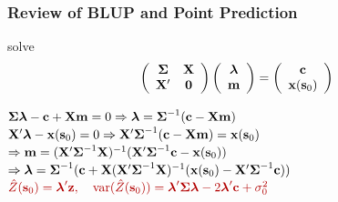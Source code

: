 \documentclass[mathserif,compress]{beamer}\usepackage{graphicx, color}
\def\bc{\mathbf{c}}
\def\bm{\mathbf{m}}
\def\bs{\mathbf{s}}
\def\bx{\mathbf{x}}
\def\bz{\mathbf{z}}
\def\bX{\mathbf{X}}
\def\blambda{\mbox{\boldmath $\lambda$}}
\def\bSigma{\mbox{\boldmath $\Sigma$}}
\def\var{\textrm{var}}
\def\bzero{\mathbf{0}}
\def\upp{^\prime}
\def\upi{^{-1}}
\newcommand{\cre}[1]{\color{red!70!black}#1}
\begin{document}
\begin{frame}[fragile]
\frametitle{Review of BLUP and Point Prediction}

	solve 
	\[
		\left(\begin{array}{cc}
		\bSigma & \bX \\ \bX\upp & \bzero
		\end{array}\right)
		\left(\begin{array}{c}
		\blambda \\ \bm
		\end{array}\right) =
		\left(\begin{array}{c}
		\bc \\ \bx(\bs_0)
		\end{array}\right)
	\]

	$\bSigma\blambda - \bc  + \bX\bm = 0 \Rightarrow \blambda = \bSigma\upi(\bc - \bX\bm)$ \\
	$\bX\upp\blambda - \bx(\bs_0) = 0 \Rightarrow \bX\upp\bSigma\upi(\bc - \bX\bm) = \bx(\bs_0)$ \\
	$\Rightarrow \bm = (\bX\upp\bSigma\upi\bX)\upi(\bX\upp\bSigma\upi\bc - \bx(\bs_0))$
	$\Rightarrow \blambda = \bSigma\upi(\bc + \bX(\bX\upp\bSigma\upi\bX)\upi(\bx(\bs_0) - \bX\upp\bSigma\upi\bc))$ \\
	\vspace{.5cm}
	$ \cre{\hat{Z}(\bs_0) = \blambda\upp\bz}, \quad \cre{\var(\hat{Z}(\bs_0)) = \blambda\upp\bSigma\blambda - 2\blambda\upp\bc + \sigma_0^2}$

\end{frame}

\end{document}
